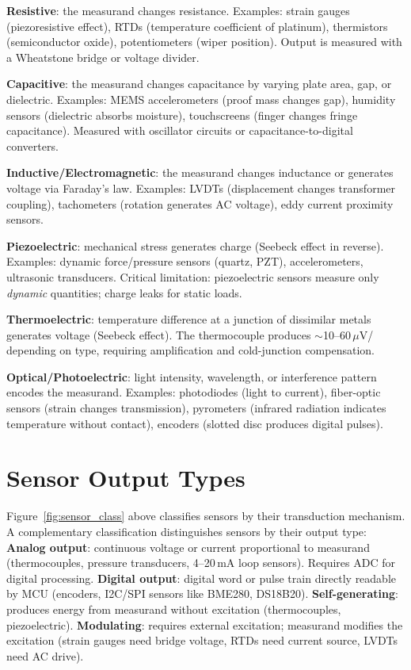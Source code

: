 \textbf{Resistive}: the measurand changes resistance. Examples: strain gauges (piezoresistive effect), RTDs (temperature coefficient of platinum), thermistors (semiconductor oxide), potentiometers (wiper position). Output is measured with a Wheatstone bridge or voltage divider.

\textbf{Capacitive}: the measurand changes capacitance by varying plate area, gap, or dielectric. Examples: MEMS accelerometers (proof mass changes gap), humidity sensors (dielectric absorbs moisture), touchscreens (finger changes fringe capacitance). Measured with oscillator circuits or capacitance-to-digital converters.

\textbf{Inductive/Electromagnetic}: the measurand changes inductance or generates voltage via Faraday's law. Examples: LVDTs (displacement changes transformer coupling), tachometers (rotation generates AC voltage), eddy current proximity sensors.

\textbf{Piezoelectric}: mechanical stress generates charge (Seebeck effect in reverse). Examples: dynamic force/pressure sensors (quartz, PZT), accelerometers, ultrasonic transducers. Critical limitation: piezoelectric sensors measure only \emph{dynamic} quantities; charge leaks for static loads.

\textbf{Thermoelectric}: temperature difference at a junction of dissimilar metals generates voltage (Seebeck effect). The thermocouple produces $\sim$10--60\,$\mu$V/\degC{} depending on type, requiring amplification and cold-junction compensation.

\textbf{Optical/Photoelectric}: light intensity, wavelength, or interference pattern encodes the measurand. Examples: photodiodes (light to current), fiber-optic sensors (strain changes transmission), pyrometers (infrared radiation indicates temperature without contact), encoders (slotted disc produces digital pulses).

\section{Sensor Output Types}
Figure~\ref{fig:sensor_class} above classifies sensors by their transduction mechanism. A complementary classification distinguishes sensors by their output type:
\textbf{Analog output}: continuous voltage or current proportional to measurand (thermocouples, pressure transducers, 4--20\,mA loop sensors). Requires ADC for digital processing. \textbf{Digital output}: digital word or pulse train directly readable by MCU (encoders, I2C/SPI sensors like BME280, DS18B20). \textbf{Self-generating}: produces energy from measurand without excitation (thermocouples, piezoelectric). \textbf{Modulating}: requires external excitation; measurand modifies the excitation (strain gauges need bridge voltage, RTDs need current source, LVDTs need AC drive).

